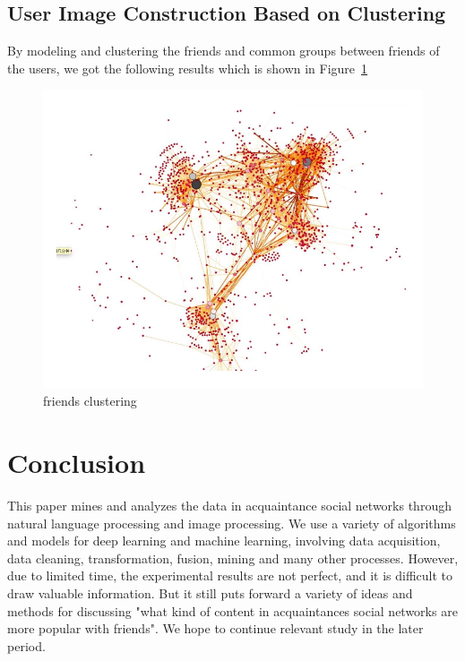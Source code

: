 \documentclass[10pt,twocolumn,letterpaper]{article}
\begin{document}
\subsection{User Image Construction Based on Clustering}
    By modeling and clustering the friends and common groups between friends of the users, we got the following results which is shown in Figure~\ref{fig:421}
    \begin{figure}[t]
    \begin{center}
    \includegraphics[width=\linewidth]{421}
    \end{center}
    \vspace{-0.5cm}
       \caption{friends clustering}
       \label{fig:421}
    \end{figure}

\section{Conclusion}
    This paper mines and analyzes the data in acquaintance social networks through natural language processing and image processing.
    We use a variety of algorithms and models for deep learning and machine learning, involving data acquisition, data cleaning, transformation, fusion, mining and many other processes.
    However, due to limited time, the experimental results are not perfect, and it is difficult to draw valuable information.
    But it still puts forward a variety of ideas and methods for discussing "what kind of content in acquaintances social networks are more popular with friends".
    We hope to continue relevant study in the later period.
{\small


}
\end{document}
